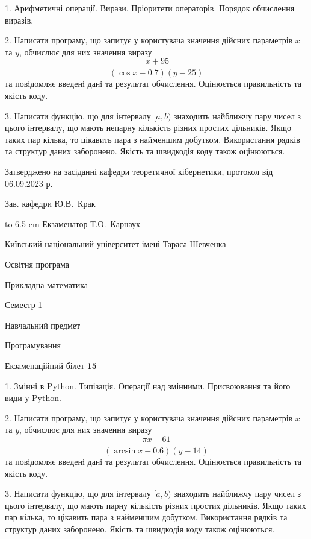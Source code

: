 \documentclass[12pt, ukrainian]{article}
\begin{document}
{%
1. Арифметичні операції. Вирази. Пріоритети операторів. Порядок обчислення виразів.%
\par
2. Написати програму, що запитує у користувача значення дійсних параметрів $x$ та $y$, обчислює для них значення виразу 
$$\frac{\ x + 95}{(\cos x - 0.7) (y - 25)}$$ 
та повiдомляє введенi данi та результат обчислення.
 Оцінюється правильність та якість коду.

\par
3. Написати функцію, що для інтервалу $[a, b)$ знаходить найближчу пару чисел з цього інтервалу, що мають непарну кількість різних простих дільників. Якщо таких пар кілька, то цікавить пара з найменшим добутком.  Використання рядків та структур даних заборонено. Якість та швидкодія коду також оцінюються. 

}
{\smallskip\smallskip \begin {scriptsize} Затверджено на засіданні кафедри теоретичної кібернетики, протокол   від   06.09.2023 р.\par\smallskip\smallskip\smallskip\smallskip
{\parbox {6.5 cm} {Зав. кафедри \dotfill Ю.В.~Крак}}\hspace {0.7cm} {\hbox to 6.5 cm { Екзаменатор \dotfill Т.О.~Карнаух}} \end{scriptsize}}
\vspace{0.9cm}
{{\begin {scriptsize}\par
{ \center  Київський національний університет імені Тараса Шевченка \par}
{\parbox {5 cm}{Освітня програма \hfill}{\parbox {7 cm}{Прикладна математика\hfill}}\parbox {6 cm}{\hfill Семестр 1}}\par
{\parbox {5 cm} {Навчальний предмет \hfill}\parbox {7 cm}{Програмування \hfill}\parbox {6cm}{\hfill}\par}\vspace{-15pt} \end{scriptsize}}{\center Екзаменаційний білет \No \textbf { 15 }\par}}
{%
1. Змінні в Python. Типізація. Операції над змінними. Присвоювання та його види у Python.%
\par
2. Написати програму, що запитує у користувача значення дійсних параметрів $x$ та $y$, обчислює для них значення виразу 
$$\frac{\pi x - 61}{(\arcsin x - 0.6) (y - 14)}$$ 
та повiдомляє введенi данi та результат обчислення.
 Оцінюється правильність та якість коду.

\par
3. Написати функцію, що для інтервалу $[a, b)$ знаходить найближчу пару чисел з цього інтервалу, що мають парну кількість різних простих дільників. Якщо таких пар кілька, то цікавить пара з найменшим добутком.  Використання рядків та структур даних заборонено. Якість та швидкодія коду також оцінюються. 

}
\end{document}
